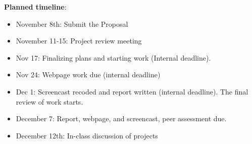 \documentclass[
]{article}
\providecommand{\tightlist}{%
  \setlength{\itemsep}{0pt}\setlength{\parskip}{0pt}}
\begin{document}
\textbf{Planned timeline}:

\begin{itemize}
\tightlist
\item
  November 8th: Submit the Proposal
\item
  November 11-15: Project review meeting
\item
  Nov 17: Finalizing plans and starting work (Internal deadline).
\item
  Nov 24: Webpage work due (internal deadline)
\item
  Dec 1: Screencast recoded and report written (internal deadline). The
  final review of work starts.
\item
  December 7: Report, webpage, and screencast, peer assessment due.
\item
  December 12th: In-class discussion of projects
\end{itemize}
\end{document}

